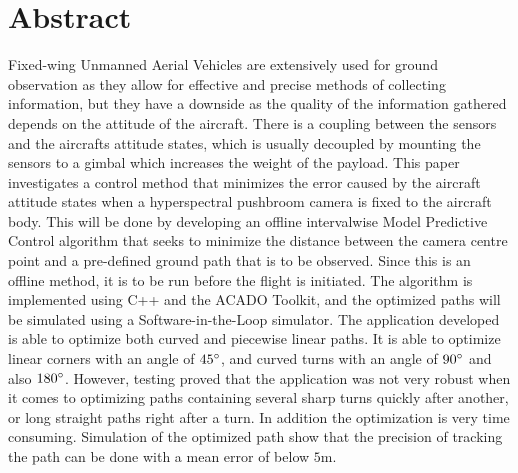 \chapter*{Abstract}

Fixed-wing Unmanned Aerial Vehicles are extensively used for ground observation as they allow for effective and precise methods of collecting information, but they have a downside as the quality of the information gathered depends on the attitude of the aircraft. There is a coupling between the sensors and the aircrafts attitude states, which is usually decoupled by mounting the sensors to a gimbal which increases the weight of the payload. This paper investigates a control method that minimizes the error caused by the aircraft attitude states when a hyperspectral pushbroom camera is fixed to the aircraft body. This will be done by developing an offline intervalwise Model Predictive Control algorithm that seeks to minimize the distance between the camera centre point and a pre-defined ground path that is to be observed. Since this is an offline method, it is to be run before the flight is initiated. The algorithm is implemented using C++ and the ACADO Toolkit, and the optimized paths will be simulated using a Software-in-the-Loop simulator. The application developed is able to optimize both curved and piecewise linear paths. It is able to optimize linear corners with an angle of $45\degree$, and curved turns with an angle of $90\degree$ and also $180\degree$. However, testing proved that the application was not very robust when it comes to optimizing paths containing several sharp turns quickly after another, or long straight paths right after a turn. In addition the optimization is very time consuming. Simulation of the optimized path show that the precision of tracking the path can be done with a mean error of below $5$m.
